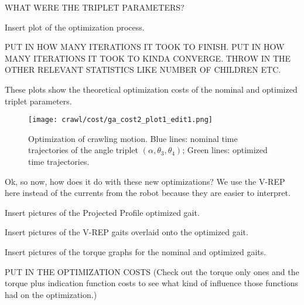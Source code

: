 WHAT WERE THE TRIPLET PARAMETERS?

Insert plot of the optimization process.

PUT IN HOW MANY ITERATIONS IT TOOK TO FINISH.
PUT IN HOW MANY ITERATIONS IT TOOK TO KINDA CONVERGE.
THROW IN THE OTHER RELEVANT STATISTICS LIKE NUMBER OF CHILDREN ETC.

These plots show the theoretical optimization costs of the nominal and optimized
triplet parameters. 

\begin{figure}
  \vspace*{-0.12in}
  \centerline{
    \texttt{[image: crawl/cost/ga\_cost2\_plot1\_edit1.png]}
  }
  \vspace*{-0.15in}
  \caption{Optimization of crawling motion. Blue lines: nominal time trajectories of the angle triplet 
           $(\alpha,\theta_3,\theta_4)$; Green lines: optimized time trajectories. }
  \vspace*{-0.17in}
  \label{fig:optimal}
\end{figure}

Ok, so now, how does it do with these new optimizations?
We use the V-REP here instead of the currents from the robot because they are easier to interpret.

Insert pictures of the Projected Profile optimized gait.

Insert pictures of the V-REP gaits overlaid onto the
optimized gait.

Insert pictures of the torque graphs for the nominal and optimized gaits.

PUT IN THE OPTIMIZATION COSTS (Check out the torque only ones and the torque plus indication
function costs to see what kind of influence those functions had on the optimization.)


